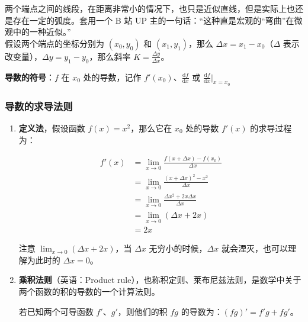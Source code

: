 两个端点之间的线段，在距离非常小的情况下，也只是近似直线，但是实际上也还是存在一定的弧度。套用一个 B 站 UP 主的一句话：“这种直是宏观的“弯曲”在微观中的一种近似。”\\
假设两个端点的坐标分别为 $(x_0, y_0)$ 和 $(x_1, y_1)$，那么 $\Delta x = x_1 - x_0$（$\Delta$ 表示改变量），$\Delta y = y_1 - y_0$，那么斜率 $K = \frac{\Delta y}{\Delta x}$。

\begin{center}
\end{center}

\textbf{导数的符号}：$f$ 在 $x_0$ 处的导数，记作 $f'(x_0)$、$\frac{\mathrm{d}f}{\mathrm{d}x}$ 或 $\frac{\mathrm{d}f}{\mathrm{d}x}|_{x=x_0}$

\subsubsection{导数的求导法则}
\begin{enumerate}
	\item \textbf{定义法}，假设函数 $f(x) = x^2$，那么它在 $x_0$ 处的导数 $f'(x)$ 的求导过程为：

	      \[
		      \begin{aligned}
			      f'(x) & = \lim_{x \to 0} \frac {f(x + \Delta x) - f(x_0)}{\Delta x} \\
			            & = \lim_{x \to 0} \frac {(x + \Delta x)^2 - x^2}{\Delta x}   \\
			            & = \lim_{x \to 0} \frac {\Delta x^2 + 2x \Delta x}{\Delta x} \\
			            & = \lim_{x \to 0} (\Delta x + 2x)                            \\
			            & = 2x
		      \end{aligned}
	      \]

	      注意 $\lim_{x \to 0} (\Delta x + 2x)$，当 $\Delta x$ 无穷小的时候，$\Delta x$ 就会湮灭，也可以理解为此时的 $\Delta x = 0$。

	\item \textbf{乘积法则}（英语：Product rule），也称积定则、莱布尼兹法则，是数学中关于两个函数的积的导数的一个计算法则。

	      若已知两个可导函数 $f'$、$g'$，则他们的积 $fg$ 的导数为：$(fg)' = f'g + fg'$。
\end{enumerate}

